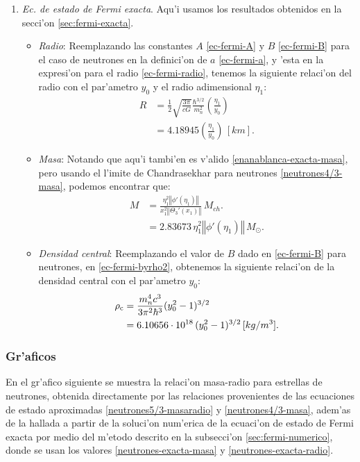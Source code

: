 \begin{enumerate}
\item \emph{Ec. de estado de Fermi exacta}. Aqu'i usamos los resultados obtenidos en la secci'on \eqref{sec:fermi-exacta}.
\begin{itemize}
\item \emph{Radio}: Reemplazando las constantes $A$ \eqref{ec-fermi-A} y $B$ \eqref{ec-fermi-B} para el caso de neutrones en la definici'on de $a$ \eqref{ec-fermi-a}, y 'esta en la expresi'on para el radio \eqref{ec-fermi-radio}, tenemos la siguiente relaci'on del radio con el par'ametro $y_0$ y el radio adimensional $\eta_1$:
\begin{align}
R&=\frac{1}{2}\sqrt{\frac{3\pi}{cG}}\frac{\hbar^{3/2}}{m_n^2}\left(\frac{\eta_1}{y_0}\right)\\
&=4.18945\left(\frac{\eta_1}{y_0}\right)\,[km].\label{neutrones-exacta-radio}
\end{align}
\item \emph{Masa}: Notando que aqu'i tambi'en es v'alido \eqref{enanablanca-exacta-masa}, pero usando el l'imite de Chandrasekhar para neutrones \eqref{neutrones4/3-masa}, podemos encontrar que:
\begin{align}
M&=\frac{\eta_1^2\left\Vert\phi'(\eta_1)\right\Vert}{x_1^2\left\Vert\Theta_3'(x_1)\right\Vert}\,M_{ch}.\\
&=2.83673\,\eta_1^2\left\Vert\phi'(\eta_1)\right\Vert\, M_{\odot}.\label{neutrones-exacta-masa}
\end{align}
\item \emph{Densidad central}: Reemplazando el valor de $B$ dado en \eqref{ec-fermi-B} para neutrones, en \eqref{ec-fermi-byrho2}, obtenemos la siguiente relaci'on de la densidad central con el par'ametro $y_0$:
\begin{align}
\rho_{\rm c}&=\frac{m_n^4 c^3}{3\pi^2\hbar^3}(y_0^2-1)^{3/2}\\
&=6.10656\cdot10^{18}\,(y_0^2-1)^{3/2}\,[kg/m^3].\label{neutrones-exacta-densidad}
\end{align}
\end{itemize}


\end{enumerate}

\subsubsection{Gr'aficos}
En el gr'afico siguiente se muestra la relaci'on masa-radio para estrellas de neutrones, obtenida directamente por las relaciones provenientes de las ecuaciones de estado aproximadas \eqref{neutrones5/3-masaradio} y \eqref{neutrones4/3-masa}, adem'as de la hallada a partir de la soluci'on num'erica de la ecuaci'on de estado de Fermi exacta por medio del m'etodo descrito en la subsecci'on \ref{sec:fermi-numerico}, donde se usan los valores \eqref{neutrones-exacta-masa} y \eqref{neutrones-exacta-radio}.


